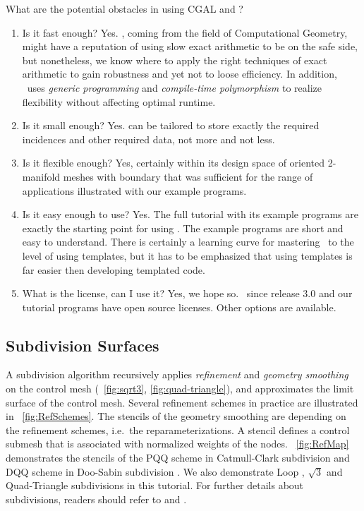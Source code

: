 \documentclass[twocolumn]{article}
\begin{document}
What are the potential obstacles in using CGAL and \cgalpoly?
\begin{enumerate}
  \item
    Is it fast enough? Yes. \cgal, coming from the field of Computational
    Geometry, might have a reputation of using slow exact arithmetic
    to be on the safe side, but nonetheless, we know where to apply
    the right techniques of exact arithmetic to gain robustness and
    yet not to loose efficiency. In addition, \cgal\ uses
    \emph{generic programming\/} and \emph{compile-time
    polymorphism\/} to realize flexibility without affecting optimal
    runtime.
  \item
    Is it small enough? Yes.  can be
    tailored to store exactly the required incidences and other
    required data, not more and not less.
  \item
    Is it flexible enough? Yes, certainly within its design
    space of oriented 2-manifold meshes with boundary that was
    sufficient for the range of applications illustrated with our
    example programs. 
  \item
    Is it easy enough to use? Yes. The full tutorial with its example
    programs are exactly the starting point for using \cgalpoly. The
    example programs are short and easy to understand. There is
    certainly a learning curve for mastering \CC\ to the level
    of using templates, but it has to be emphasized that
    using templates is far easier then developing templated code.
  \item
    What is the license, can I use it? Yes, we hope so. \cgal\ since
    release 3.0 and our tutorial programs have open source
    licenses. Other options are available.
\end{enumerate}

\subsection*{Subdivision Surfaces}

A subdivision algorithm recursively 
applies \emph{refinement} and \emph{geometry smoothing} 
on the control mesh (\figurename\ \ref{fig:sqrt3},  
\ref{fig:quad-triangle}), 
and approximates the limit surface of the control mesh.  Several
refinement schemes in practice are illustrated in
\figurename\ \ref{fig:RefSchemes}. The stencils of the
geometry smoothing are depending on the refinement schemes, 
i.e.\ the reparameterizations. A stencil defines a control
submesh that is associated with normalized weights of the 
nodes. \figurename\ \ref{fig:RefMap} 
demonstrates the stencils of the PQQ scheme  
in Catmull-Clark subdivision \cite{cc} and DQQ scheme in Doo-Sabin
subdivision \cite{ds}. We also demonstrate Loop \cite{loop}, 
$\sqrt{3}$ \cite{sqrt3} and Quad-Triangle \cite{qts} subdivisions 
in this tutorial. For further details about subdivisions, readers
should refer to \cite{Warren:subdivision} and \cite{Sub:course:2000}.
   
\end{document}
